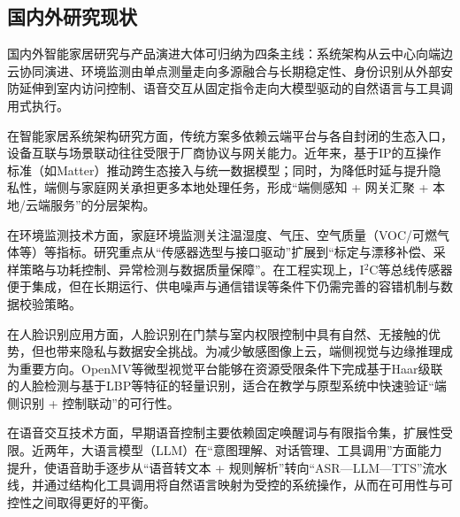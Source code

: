 \subsection{国内外研究现状}
\par 国内外智能家居研究与产品演进大体可归纳为四条主线：系统架构从云中心向端边云协同演进、环境监测由单点测量走向多源融合与长期稳定性、身份识别从外部安防延伸到室内访问控制、语音交互从固定指令走向大模型驱动的自然语言与工具调用式执行。
\par 在智能家居系统架构研究方面，传统方案多依赖云端平台与各自封闭的生态入口，设备互联与场景联动往往受限于厂商协议与网关能力。近年来，基于IP的互操作标准（如Matter）推动跨生态接入与统一数据模型；同时，为降低时延与提升隐私性，端侧与家庭网关承担更多本地处理任务，形成“端侧感知 + 网关汇聚 + 本地/云端服务”的分层架构\cite{csa_matter14,eet_matter2026}。
\par 在环境监测技术方面，家庭环境监测关注温湿度、气压、空气质量（VOC/可燃气体等）等指标。研究重点从“传感器选型与接口驱动”扩展到“标定与漂移补偿、采样策略与功耗控制、异常检测与数据质量保障”。在工程实现上，I\(^2\)C等总线传感器便于集成，但在长期运行、供电噪声与通信错误等条件下仍需完善的容错机制与数据校验策略。
\par 在人脸识别应用方面，人脸识别在门禁与室内权限控制中具有自然、无接触的优势，但也带来隐私与数据安全挑战。为减少敏感图像上云，端侧视觉与边缘推理成为重要方向。OpenMV等微型视觉平台能够在资源受限条件下完成基于Haar级联的人脸检测与基于LBP等特征的轻量识别，适合在教学与原型系统中快速验证“端侧识别 + 控制联动”的可行性。
\par 在语音交互技术方面，早期语音控制主要依赖固定唤醒词与有限指令集，扩展性受限。近两年，大语言模型（LLM）在“意图理解、对话管理、工具调用”方面能力提升，使语音助手逐步从“语音转文本 + 规则解析”转向“ASR—LLM—TTS”流水线，并通过结构化工具调用将自然语言映射为受控的系统操作，从而在可用性与可控性之间取得更好的平衡。

